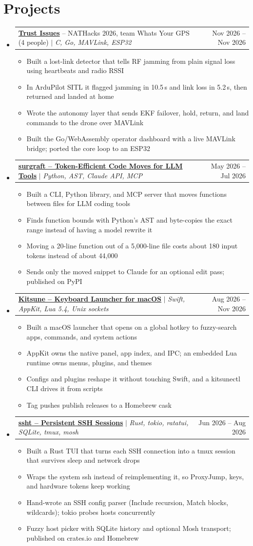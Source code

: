\documentclass[letterpaper,10pt]{article}
\makeatletter
\newcommand{\resumeItem}[1]{
  \item\small{
    {#1 \vspace{-2pt}}
  }
}
\newcommand{\resumeProjectHeading}[2]{
    \item
    \begin{tabular*}{0.97\textwidth}{l@{\extracolsep{\fill}}r}
      \small#1 & #2 \\
    \end{tabular*}\vspace{-7pt}
}
\newcommand{\resumeItemListStart}{\begin{itemize}[leftmargin=0.15in, label=\textbullet, itemsep=0pt, topsep=2pt]}
\newcommand{\resumeItemListEnd}{\end{itemize}\vspace{-5pt}}
\newcommand{\resumeSubHeadingListStart}{\begin{itemize}[leftmargin=0.15in, label={}]}
\newcommand{\resumeSubHeadingListEnd}{\end{itemize}}
\makeatother
\begin{document}
\section{Projects}
    \resumeSubHeadingListStart
      \resumeProjectHeading
          {\href{https://github.com/HameedFawwaz/NATHacks_2026}{\textbf{Trust Issues}} -- NATHacks 2026, team Whats Your GPS (4 people) $|$ \emph{C, Go, MAVLink, ESP32}}{Nov 2026 -- Nov 2026}
          \resumeItemListStart
            \resumeItem{Built a lost-link detector that tells RF jamming from plain signal loss using heartbeats and radio RSSI}
            \resumeItem{In ArduPilot SITL it flagged jamming in 10.5\,s and link loss in 5.2\,s, then returned and landed at home}
            \resumeItem{Wrote the autonomy layer that sends EKF failover, hold, return, and land commands to the drone over MAVLink}
            \resumeItem{Built the Go/WebAssembly operator dashboard with a live MAVLink bridge; ported the core loop to an ESP32}
          \resumeItemListEnd
      \resumeProjectHeading
          {\href{https://github.com/mayaanhafeez/surgraft}{\textbf{surgraft -- Token-Efficient Code Moves for LLM Tools}} $|$ \emph{Python, AST, Claude API, MCP}}{May 2026 -- Jul 2026}
          \resumeItemListStart
            \resumeItem{Built a CLI, Python library, and MCP server that moves functions between files for LLM coding tools}
            \resumeItem{Finds function bounds with Python's AST and byte-copies the exact range instead of having a model rewrite it}
            \resumeItem{Moving a 20-line function out of a 5,000-line file costs about 180 input tokens instead of about 44,000}
            \resumeItem{Sends only the moved snippet to Claude for an optional edit pass; published on PyPI}
          \resumeItemListEnd
      \resumeProjectHeading
          {\href{https://github.com/mayaanhafeez/app_launcher}{\textbf{Kitsune -- Keyboard Launcher for macOS}} $|$ \emph{Swift, AppKit, Lua 5.4, Unix sockets}}{Aug 2026 -- Nov 2026}
          \resumeItemListStart
            \resumeItem{Built a macOS launcher that opens on a global hotkey to fuzzy-search apps, commands, and system actions}
            \resumeItem{AppKit owns the native panel, app index, and IPC; an embedded Lua runtime owns menus, plugins, and themes}
            \resumeItem{Configs and plugins reshape it without touching Swift, and a kitsunectl CLI drives it from scripts}
            \resumeItem{Tag pushes publish releases to a Homebrew cask}
          \resumeItemListEnd
      \resumeProjectHeading
          {\href{https://github.com/mayaanhafeez/ssht}{\textbf{ssht -- Persistent SSH Sessions}} $|$ \emph{Rust, tokio, ratatui, SQLite, tmux, mosh}}{Jun 2026 -- Aug 2026}
          \resumeItemListStart
            \resumeItem{Built a Rust TUI that turns each SSH connection into a tmux session that survives sleep and network drops}
            \resumeItem{Wraps the system ssh instead of reimplementing it, so ProxyJump, keys, and hardware tokens keep working}
            \resumeItem{Hand-wrote an SSH config parser (Include recursion, Match blocks, wildcards); tokio probes hosts concurrently}
            \resumeItem{Fuzzy host picker with SQLite history and optional Mosh transport; published on crates.io and Homebrew}
          \resumeItemListEnd
    \resumeSubHeadingListEnd
\end{document}
